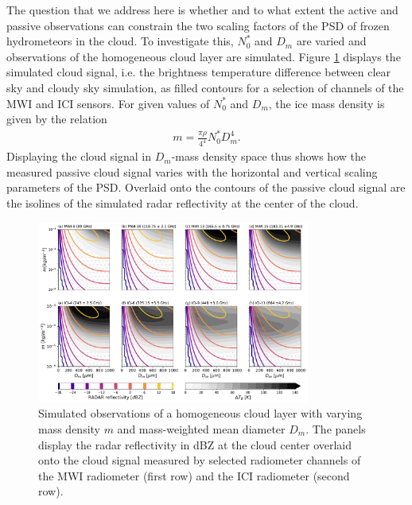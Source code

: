 \documentclass[journal abbreviation, manuscript]{copernicus}
\begin{document}
The question that we address here is whether and to what extent the active and
passive observations can constrain the two scaling factors of the PSD of frozen
hydrometeors in the cloud. To investigate this, $N_0^*$ and $D_m$ are varied and
observations of the homogeneous cloud layer are simulated. Figure
\ref{fig:isolines} displays the simulated cloud signal, i.e. the brightness
temperature difference between clear sky and cloudy sky simulation, as filled
contours for a selection of channels of the MWI and ICI sensors. For given
values of $N_0^*$ and $D_m$, the ice mass density is given by the relation
\begin{align}
m = \frac{\pi \rho}{4 ^ 4}N_0^* D_m^4.
\end{align}
Displaying the cloud signal in $D_m$-mass density space thus shows how the
measured passive cloud signal varies with the horizontal and vertical scaling
parameters of the PSD. Overlaid onto the contours of the passive cloud signal are
the isolines of the simulated radar reflectivity at the center of the cloud.

\begin{figure}
\centering
\includegraphics[width = 0.8\textwidth]{../plots/contours}
\caption{Simulated observations of a homogeneous cloud layer with
varying mass density $m$ and mass-weighted mean diameter $D_m$. The panels
display the radar reflectivity in dBZ at the cloud center overlaid onto the
cloud signal measured by selected radiometer channels of the MWI radiometer
(first row) and the ICI radiometer (second row).}
\label{fig:isolines}
\end{figure}
\end{document}
